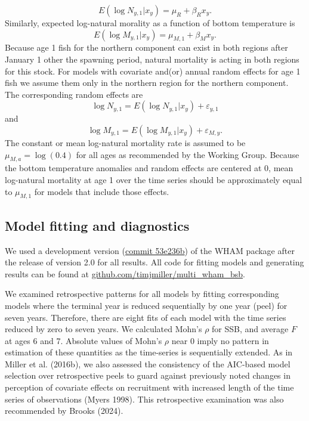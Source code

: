 \documentclass[
]{article}
\begin{document}
\begin{equation}\label{eq:expected-recruitment}
E\left(\log N_{y,1}|x_y\right) = \mu_{R} + \beta_{R} x_y.
\end{equation}
Similarly, expected log-natural morality as a function of bottom temperature is
\begin{equation}\label{eq:expected-M1}
E\left(\log M_{y,1}|x_y\right) = \mu_{M,1} + \beta_{M} x_y.
\end{equation}
Because age 1 fish for the northern component can exist in both regions after January 1 other the spawning period, natural mortality is acting in both regions for this stock. For models with covariate and(or) annual random effects for age 1 fish we assume them only in the northern region for the northern component. The corresponding random effects are
\begin{equation}\label{eq:Rec-re}
\log N_{y,1} = E\left(\log N_{y,1}|x_y\right) + \varepsilon_{y,1}
\end{equation}
and
\begin{equation}\label{eq:M-re}
\log M_{y,1} = E\left(\log M_{y,1}|x_y\right) + \varepsilon_{M,y}.
\end{equation}
The constant or mean log-natural mortality rate is assumed to be \(\mu_{M,a} = \log(0.4)\) for all ages as recommended by the Working Group. Because the bottom temperature anomalies and random effects are centered at 0, mean log-natural mortality at age 1 over the time series should be approximately equal to \(\mu_{M,1}\) for models that include those effects.

\hypertarget{model-fitting-and-diagnostics}{%
\subsection*{Model fitting and diagnostics}\label{model-fitting-and-diagnostics}}

We used a development version (\href{https://github.com/timjmiller/wham/tree/53e236b}{commit 53e236b}) of the WHAM package after the release of version 2.0 for all results. All code for fitting models and generating results can be found at \href{https://github.com/timjmiller/multi_wham_bsb}{github.com/timjmiller/multi\_wham\_bsb}.

We examined retrospective patterns for all models by fitting corresponding models where the terminal year is reduced sequentially by one year (peel) for seven years. Therefore, there are eight fits of each model with the time series reduced by zero to seven years. We calculated Mohn's \(\rho\) for SSB, and average \(F\) at ages 6 and 7. Absolute values of Mohn's \(\rho\) near 0 imply no pattern in estimation of these quantities as the time-series is sequentially extended. As in Miller et al. (2016b), we also assessed the consistency of the AIC-based model selection over retrospective peels to guard against previously noted changes in perception of covariate effects on recruitment with increased length of the time series of observations (Myers 1998). This retrospective examination was also recommended by Brooks (2024).
\end{document}
